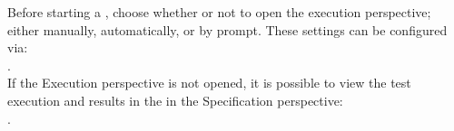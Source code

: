 % 
%
%

Before starting a \gdsuite{}, choose whether or not to 
open the execution perspective; either manually, automatically, or by prompt. 
These settings can be configured via:
 \\ . 
\\
If the Execution perspective is not 
opened, it is possible to view the test execution and 
results in the \gdtestresultview in 
the Specification perspective:\\ .
